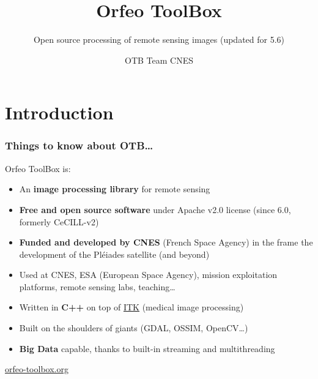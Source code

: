 \documentclass[8pt]{beamer}
\title{Orfeo ToolBox}
\subtitle{Open source processing of remote sensing images (updated for 5.6)}
\author{OTB Team CNES}
\date{}
\begin{document}
\begin{frame}
\titlepage
\end{frame}

\section*{Introduction}

\begin{frame}
\frametitle{Things to know about OTB\ldots}
\begin{block}{Orfeo ToolBox is:}
\begin{itemize}
\item An \textbf{image processing library} for remote sensing
\item \textbf{Free and open source software} under Apache v2.0 license (since 6.0, formerly CeCILL-v2)
\item \textbf{Funded and developed by CNES} (French Space Agency) in the frame the development of the Pléiades satellite (and beyond)
\item Used at CNES, ESA (European Space Agency), mission exploitation platforms,
  remote sensing labs, teaching\ldots
\item Written in \textbf{C++} on top of \href{www.itk.org}{ITK} (medical image
  processing)
\item Built on the shoulders of giants (GDAL, OSSIM, OpenCV\ldots)
\item \textbf{Big Data} capable, thanks to built-in streaming and multithreading
\end{itemize}
\end{block}

\begin{center}
{\huge\textcolor{red}{\href{http://www.orfeo-toolbox.org}{orfeo-toolbox.org}}}
\end{center}

\end{frame}
\end{document}
